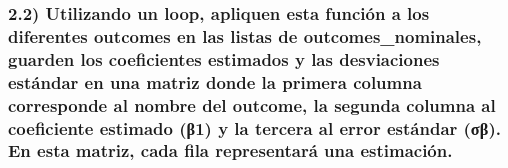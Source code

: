 \documentclass[
]{article}
\begin{document}
\hypertarget{utilizando-un-loop-apliquen-esta-funciuxf3n-a-los-diferentes-outcomes-en-las-listas-de-outcomes_nominales-guarden-los-coeficientes-estimados-y-las-desviaciones-estuxe1ndar-en-una-matriz-donde-la-primera-columna-corresponde-al-nombre-del-outcome-la-segunda-columna-al-coeficiente-estimado-ux3b21-y-la-tercera-al-error-estuxe1ndar-ux3c3ux3b2.-en-esta-matriz-cada-fila-representaruxe1-una-estimaciuxf3n.}{%
\subsubsection{2.2) Utilizando un loop, apliquen esta función a los
diferentes outcomes en las listas de outcomes\_nominales, guarden los
coeficientes estimados y las desviaciones estándar en una matriz donde
la primera columna corresponde al nombre del outcome, la segunda columna
al coeficiente estimado (β1) y la tercera al error estándar (σβ). En
esta matriz, cada fila representará una
estimación.}\label{utilizando-un-loop-apliquen-esta-funciuxf3n-a-los-diferentes-outcomes-en-las-listas-de-outcomes_nominales-guarden-los-coeficientes-estimados-y-las-desviaciones-estuxe1ndar-en-una-matriz-donde-la-primera-columna-corresponde-al-nombre-del-outcome-la-segunda-columna-al-coeficiente-estimado-ux3b21-y-la-tercera-al-error-estuxe1ndar-ux3c3ux3b2.-en-esta-matriz-cada-fila-representaruxe1-una-estimaciuxf3n.}}
\end{document}

